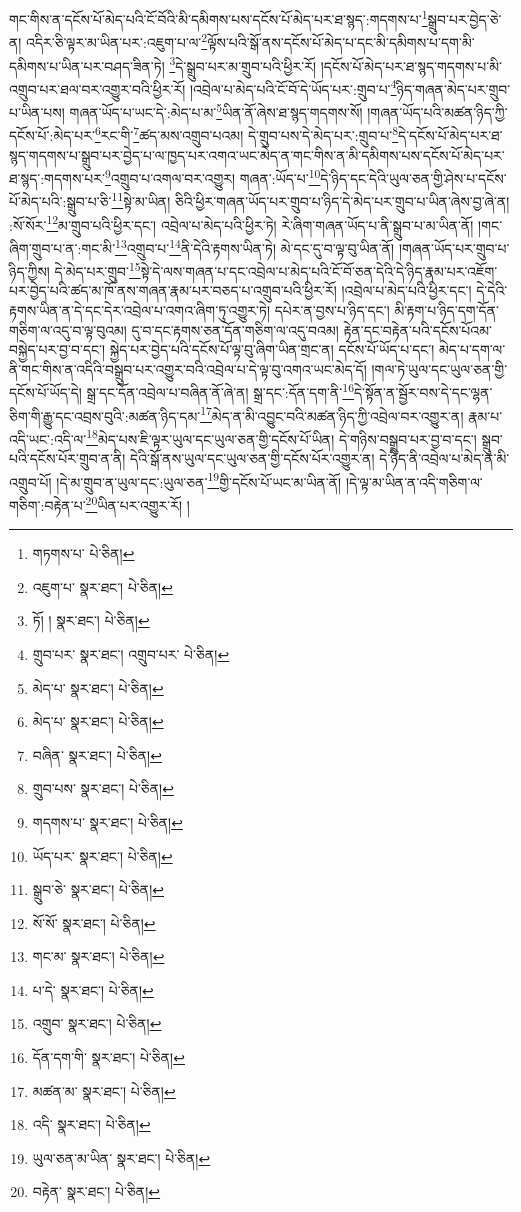 གང་གིས་ན་དངོས་པོ་མེད་པའི་ངོ་བོའི་མི་དམིགས་པས་དངོས་པོ་མེད་པར་ཐ་སྙད་:གདགས་པ་\footnote{གཏགས་པ་  པེ་ཅིན། }སྒྲུབ་པར་བྱེད་ཅེ་ན། འདིར་ཅི་ལྟར་མ་ཡིན་པར་:འཇུག་པ་ལ་\footnote{འཇུག་པ་  སྣར་ཐང་།  པེ་ཅིན། }ལྟོས་པའི་སྒོ་ནས་དངོས་པོ་མེད་པ་དང་མི་དམིགས་པ་དག་མི་དམིགས་པ་ཡིན་པར་བཤད་ཟིན་ཏེ། \footnote{ཏོ། །   སྣར་ཐང་།  པེ་ཅིན། }དེ་སྒྲུབ་པར་མ་གྲུབ་པའི་ཕྱིར་རོ། །དངོས་པོ་མེད་པར་ཐ་སྙད་གདགས་པ་མི་འགྲུབ་པར་ཐལ་བར་འགྱུར་བའི་ཕྱིར་རོ། །འབྲེལ་པ་མེད་པའི་ངོ་བོ་དེ་ཡོད་པར་:གྲུབ་པ་\footnote{གྲུབ་པར་  སྣར་ཐང་། འགྲུབ་པར་  པེ་ཅིན། }ཉིད་གཞན་མེད་པར་གྲུབ་པ་ཡིན་པས། གཞན་ཡོད་པ་ཡང་དེ་:མེད་པ་མ་\footnote{མེད་པ་  སྣར་ཐང་།  པེ་ཅིན། }ཡིན་ནོ་ཞེས་ཐ་སྙད་གདགས་སོ། །གཞན་ཡོད་པའི་མཚན་ཉིད་ཀྱི་དངོས་པོ་:མེད་པར་\footnote{མེད་པ་  སྣར་ཐང་།  པེ་ཅིན། }རང་གི་\footnote{བཞིན་  སྣར་ཐང་།  པེ་ཅིན། }ཚད་མས་འགྲུབ་པའམ། དེ་གྲུབ་པས་དེ་མེད་པར་:གྲུབ་པ་\footnote{གྲུབ་པས་  སྣར་ཐང་།  པེ་ཅིན། }དེ་དངོས་པོ་མེད་པར་ཐ་སྙད་གདགས་པ་སྒྲུབ་པར་བྱེད་པ་ལ་ཁྱད་པར་འགའ་ཡང་མེད་ན་གང་གིས་ན་མི་དམིགས་པས་དངོས་པོ་མེད་པར་ཐ་སྙད་:གདགས་པར་\footnote{གདགས་པ་  སྣར་ཐང་།  པེ་ཅིན། }འགྲུབ་པ་འགལ་བར་འགྱུར། གཞན་:ཡོད་པ་\footnote{ཡོད་པར་  སྣར་ཐང་།  པེ་ཅིན། }དེ་ཉིད་དང་དེའི་ཡུལ་ཅན་གྱི་ཤེས་པ་དངོས་པོ་མེད་པའི་:སྒྲུབ་པ་ཅི་\footnote{སྒྲུབ་ཅེ་  སྣར་ཐང་།  པེ་ཅིན། }སྟེ་མ་ཡིན། ཅིའི་ཕྱིར་གཞན་ཡོད་པར་གྲུབ་པ་ཉིད་དེ་མེད་པར་གྲུབ་པ་ཡིན་ཞེས་བྱ་ཞེ་ན། :སོ་སོར་\footnote{སོ་སོ་  སྣར་ཐང་།  པེ་ཅིན། }མ་གྲུབ་པའི་ཕྱིར་དང་། འབྲེལ་པ་མེད་པའི་ཕྱིར་ཏེ། རེ་ཞིག་གཞན་ཡོད་པ་ནི་སྒྲུབ་པ་མ་ཡིན་ནོ། །གང་ཞིག་གྲུབ་པ་ན་:གང་མི་\footnote{གང་མ་  སྣར་ཐང་།  པེ་ཅིན། }འགྲུབ་པ་\footnote{པ་དེ་  སྣར་ཐང་།  པེ་ཅིན། }ནི་དེའི་རྟགས་ཡིན་ཏེ། མེ་དང་དུ་བ་ལྟ་བུ་ཡིན་ནོ། །གཞན་ཡོད་པར་གྲུབ་པ་ཉིད་ཀྱིས། དེ་མེད་པར་གྲུབ་\footnote{འགྲུབ་  སྣར་ཐང་།  པེ་ཅིན། }སྟེ་དེ་ལས་གཞན་པ་དང་འབྲེལ་པ་མེད་པའི་ངོ་བོ་ཅན་དེའི་དེ་ཉིད་རྣམ་པར་འཇོག་པར་བྱེད་པའི་ཚད་མ་ཁོ་ནས་གཞན་རྣམ་པར་བཅད་པ་འགྲུབ་པའི་ཕྱིར་རོ། །འབྲེལ་པ་མེད་པའི་ཕྱིར་དང་། དེ་དེའི་རྟགས་ཡིན་ན་དེ་དང་དེར་འབྲེལ་པ་འགའ་ཞིག་ཏུ་འགྱུར་ཏེ། དཔེར་ན་བྱས་པ་ཉིད་དང་། མི་རྟག་པ་ཉིད་དག་དོན་གཅིག་ལ་འདུ་བ་ལྟ་བུའམ། དུ་བ་དང་རྟགས་ཅན་དོན་གཅིག་ལ་འདུ་བའམ། རྟེན་དང་བརྟེན་པའི་དངོས་པོའམ་བསྐྱེད་པར་བྱ་བ་དང་། སྐྱེད་པར་བྱེད་པའི་དངོས་པོ་ལྟ་བུ་ཞིག་ཡིན་གྲང་ན། དངོས་པོ་ཡོད་པ་དང་། མེད་པ་དག་ལ་ནི་གང་གིས་ན་འདིའི་བསྒྲུབ་པར་འགྱུར་བའི་འབྲེལ་པ་དེ་ལྟ་བུ་འགའ་ཡང་མེད་དོ། །གལ་ཏེ་ཡུལ་དང་ཡུལ་ཅན་གྱི་དངོས་པོ་ཡོད་དེ། སྒྲ་དང་དོན་འབྲེལ་པ་བཞིན་ནོ་ཞེ་ན། སྒྲ་དང་:དོན་དག་ནི་\footnote{དོན་དག་གི་  སྣར་ཐང་།  པེ་ཅིན། }དེ་སྟོན་ན་སྦྱོར་བས་དེ་དང་ལྷན་ཅིག་གི་རྒྱུ་དང་འབྲས་བུའི་:མཚན་ཉིད་དམ་\footnote{མཚན་མ་  སྣར་ཐང་།  པེ་ཅིན། }མེད་ན་མི་འབྱུང་བའི་མཚན་ཉིད་ཀྱི་འབྲེལ་བར་འགྱུར་ན། རྣམ་པ་འདི་ཡང་:འདི་ལ་\footnote{འདི་  སྣར་ཐང་།  པེ་ཅིན། }མེད་པས་ཇི་ལྟར་ཡུལ་དང་ཡུལ་ཅན་གྱི་དངོས་པོ་ཡིན། དེ་གཉིས་བསྒྲུབ་པར་བྱ་བ་དང་། སྒྲུབ་པའི་དངོས་པོར་གྲུབ་ན་ནི། དེའི་སྒོ་ནས་ཡུལ་དང་ཡུལ་ཅན་གྱི་དངོས་པོར་འགྱུར་ན། དེ་ཉིད་ནི་འབྲེལ་པ་མེད་ན་མི་འགྲུབ་པོ། །དེ་མ་གྲུབ་ན་ཡུལ་དང་:ཡུལ་ཅན་\footnote{ཡུལ་ཅན་མ་ཡིན་  སྣར་ཐང་།  པེ་ཅིན། }གྱི་དངོས་པོ་ཡང་མ་ཡིན་ནོ། །དེ་ལྟ་མ་ཡིན་ན་འདི་གཅིག་ལ་གཅིག་:བརྟེན་པ་\footnote{བརྟེན་  སྣར་ཐང་།  པེ་ཅིན། }ཡིན་པར་འགྱུར་རོ། །
